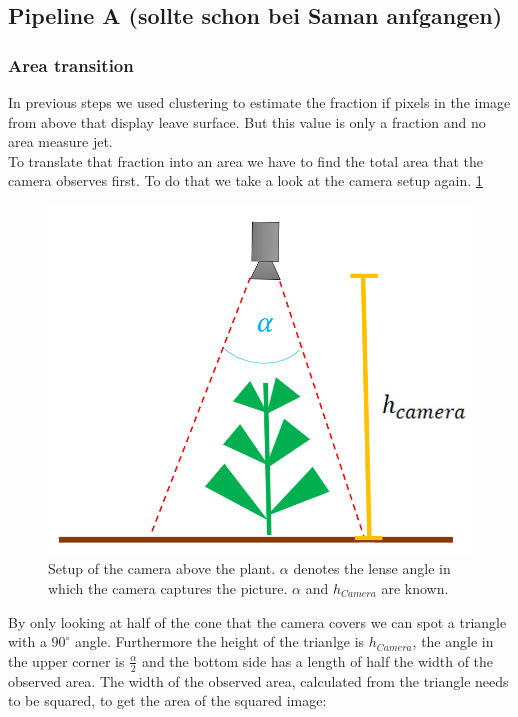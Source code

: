 \graphicspath{{members/tf/figures/}}

\subsection{Pipeline A (sollte schon bei Saman anfgangen)}

\subsubsection{Area transition}
In previous steps we used clustering to estimate the fraction if pixels in the image from above that display leave surface. But this value is only a fraction and no area measure jet.\\
To translate that fraction into an area we have to find the total area that the camera observes first. To do that we take a look at the camera setup again. \ref{fig:setupAbove}
   \begin{figure}[H]
       \centering
       \includegraphics[scale=0.6]{setupAbove.PNG}
       \caption{Setup of the camera above the plant. $\alpha$ denotes the lense angle in which the camera captures the picture. $\alpha$ and $h_{Camera}$ are known.}
       \label{fig:setupAbove}
   \end{figure}
By only looking at half of the cone that the camera covers we can spot a triangle with a $90^{\circ}$ angle. Furthermore the height of the trianlge is $h_{Camera}$, the angle in the upper corner is $\frac{\alpha}{2}$ and the bottom side has a length of half the width of the observed area. The width of the observed area, calculated from the triangle needs to be squared, to get the area of the squared image:\\
